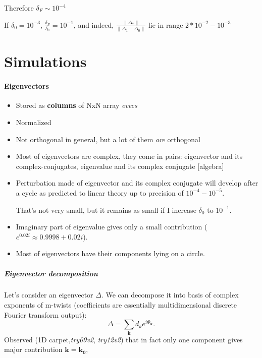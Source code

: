 \documentclass[a4paper,12pt]{article}
\newcommand{\D}{\Delta}%
\begin{document}
Therefore $\delta_F \sim 10 ^{ -4}$

If $\delta_0 = 10 ^{-3}$, $\frac{ \delta_F } {  \delta_0 } = 10^{-1}$, and indeed,
$ \frac{ \lVert \D_* \rVert }  {\lVert \D_1 - \D_0 \rVert }$ lie in range $2 * 10^{-2} - 10 ^{-3} $




\newpage
\part*{Simulations}


\subsection*{Eigenvectors}

\begin{itemize}

\item Stored as \textbf{columns} of NxN array \textit{evecs}
\item Normalized
\item Not orthogonal in general, but a lot of them \emph{are} orthogonal
\item Most of eigenvectors are complex, they come in pairs: eigenvector and its complex-conjugates, eigenvalue and its complex conjugate [algebra]
\item Perturbation made of eigenvector and its complex conjugate will develop after a cycle as predicted to linear theory up to precision of $10^{-4} - 10^{ -5}$.

 That's not very small, but it remains as small if I increase $\delta_0$ to $10 ^{ -1}$.
 
\item Imaginary part of eigenvalue gives only a small contribution ($e^{0.02 i} \approx 0.9998 + 0.02 i$).
\item Most of eigenvectors have their components lying on a circle.

\end{itemize}

\subsubsection*{ Eigenvector decomposition}
Let's consider an eigenvector $\D$. We can decompose it into basis of complex exponents of m-twists (coefficients are essentially multidimensional discrete Fourier transform output):
$$
\D = \sum_{\mathbf{k}} d_k e^{i \Phi_\mathbf{k}}.
$$
Observed (1D carpet,\textit{try09v2}, \textit{try12v2}) that in fact only one component gives major contribution $\mathbf{k}=\mathbf{k_0}$,
\end{document}
